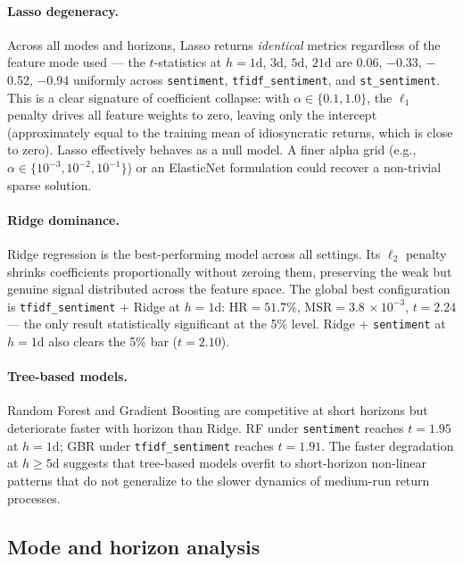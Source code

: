 \documentclass{article}
\begin{document}
\paragraph{Lasso degeneracy.}
Across all modes and horizons, Lasso returns \emph{identical} metrics regardless of the feature mode used — the $t$-statistics at $h=1\text{d}$, $3\text{d}$, $5\text{d}$, $21\text{d}$ are 0.06, $-$0.33, $-$0.52, $-$0.94 uniformly across \texttt{sentiment}, \texttt{tfidf\_sentiment}, and \texttt{st\_sentiment}. This is a clear signature of coefficient collapse: with $\alpha \in \{0.1, 1.0\}$, the $\ell_1$ penalty drives all feature weights to zero, leaving only the intercept (approximately equal to the training mean of idiosyncratic returns, which is close to zero). Lasso effectively behaves as a null model. A finer alpha grid (e.g., $\alpha \in \{10^{-3}, 10^{-2}, 10^{-1}\}$) or an ElasticNet formulation could recover a non-trivial sparse solution.

\paragraph{Ridge dominance.}
Ridge regression is the best-performing model across all settings. Its $\ell_2$ penalty shrinks coefficients proportionally without zeroing them, preserving the weak but genuine signal distributed across the feature space. The global best configuration is \texttt{tfidf\_sentiment} + Ridge at $h=1\text{d}$: $\mathrm{HR}=51.7\%$, $\mathrm{MSR}=3.8\,\times10^{-3}$, $t=2.24$ — the only result statistically significant at the 5\% level. Ridge + \texttt{sentiment} at $h=1\text{d}$ also clears the 5\% bar ($t=2.10$).

\paragraph{Tree-based models.}
Random Forest and Gradient Boosting are competitive at short horizons but deteriorate faster with horizon than Ridge. RF under \texttt{sentiment} reaches $t=1.95$ at $h=1\text{d}$; GBR under \texttt{tfidf\_sentiment} reaches $t=1.91$. The faster degradation at $h \geq 5\text{d}$ suggests that tree-based models overfit to short-horizon non-linear patterns that do not generalize to the slower dynamics of medium-run return processes.

\subsection{Mode and horizon analysis}
\label{sec:mode_horizon}
\end{document}
